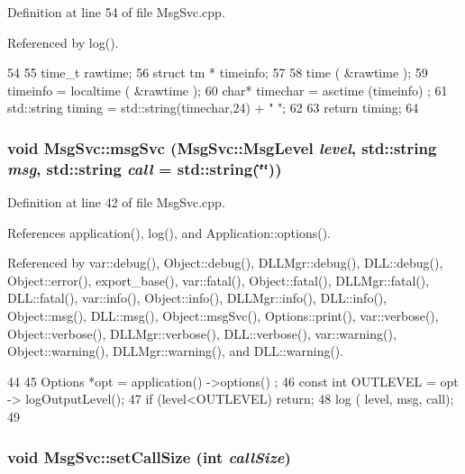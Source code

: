 Definition at line 54 of file MsgSvc.cpp.

Referenced by log().


\begin{DoxyCode}
54                          {
55   time_t rawtime;
56   struct tm * timeinfo;
57   
58   time ( &rawtime );
59   timeinfo = localtime ( &rawtime );
60   char* timechar =  asctime (timeinfo) ;
61   std::string timing = std::string(timechar,24) + " ";
62 
63   return timing;
64 }
\end{DoxyCode}
\hypertarget{classMsgSvc_ad25f18047920cc59a314e5098259711c}{
\subsubsection[{msgSvc}]{\setlength{\rightskip}{0pt plus 5cm}void MsgSvc::msgSvc ({\bf MsgSvc::MsgLevel} {\em level}, \/  std::string {\em msg}, \/  std::string {\em call} = {\ttfamily std::string(\char`\"{}\char`\"{})})}}
\label{classMsgSvc_ad25f18047920cc59a314e5098259711c}


Definition at line 42 of file MsgSvc.cpp.

References application(), log(), and Application::options().

Referenced by var::debug(), Object::debug(), DLLMgr::debug(), DLL::debug(), Object::error(), export\_\-base(), var::fatal(), Object::fatal(), DLLMgr::fatal(), DLL::fatal(), var::info(), Object::info(), DLLMgr::info(), DLL::info(), Object::msg(), DLL::msg(), Object::msgSvc(), Options::print(), var::verbose(), Object::verbose(), DLLMgr::verbose(), DLL::verbose(), var::warning(), Object::warning(), DLLMgr::warning(), and DLL::warning().


\begin{DoxyCode}
44                                      {
45   Options *opt = application() ->options() ;
46   const int OUTLEVEL = opt -> logOutputLevel(); 
47   if (level<OUTLEVEL) return;
48   log ( level, msg, call);  
49 } 
\end{DoxyCode}
\hypertarget{classMsgSvc_a50854fb6f9df98bc170f690941747b61}{
\subsubsection[{setCallSize}]{\setlength{\rightskip}{0pt plus 5cm}void MsgSvc::setCallSize (int {\em callSize})}}
\label{classMsgSvc_a50854fb6f9df98bc170f690941747b61}


